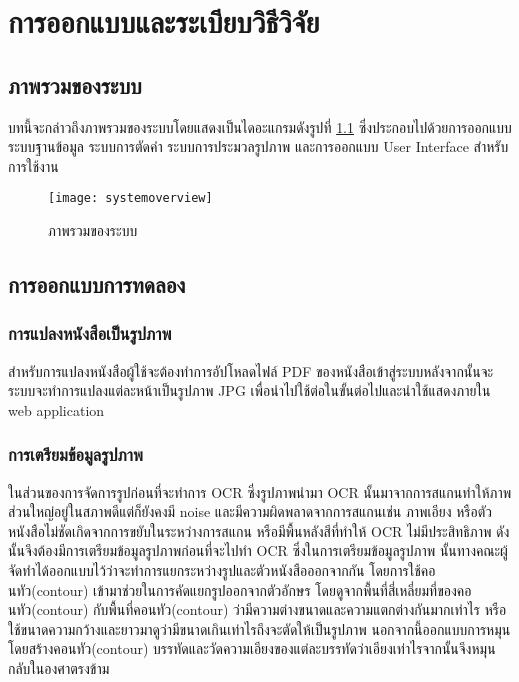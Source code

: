 \chapter{การออกแบบและระเบียบวิธีวิจัย}

\section{ภาพรวมของระบบ}

บทนี้จะกล่าวถึงภาพรวมของระบบโดยแสดงเป็นไดอะแกรมดังรูปที่ \ref{fig:systemoverview} ซึ่งประกอบไปด้วยการออกแบบระบบฐานข้อมูล ระบบการตัดคำ ระบบการประมวลรูปภาพ และการออกแบบ User Interface สำหรับการใช้งาน

\begin{figure}[H]
    \centering
    \texttt{[image: systemoverview]}
    \caption{ภาพรวมของระบบ}\label{fig:systemoverview}
\end{figure}

\section{การออกแบบการทดลอง}
\subsection{การแปลงหนังสือเป็นรูปภาพ}

สำหรับการแปลงหนังสือผู้ใช้จะต้องทำการอัปโหลดไฟล์ PDF ของหนังสือเข้าสู่ระบบหลังจากนั้นจะระบบจะทำการแปลงแต่ละหน้าเป็นรูปภาพ JPG เพื่อนำไปใช้ต่อในขั้นต่อไปและนำใช้แสดงภายใน web application

\subsection{การเตรียมข้อมูลรูปภาพ}

ในส่วนของการจัดการรูปก่อนที่จะทำการ OCR ซึ่งรูปภาพนำมา OCR นั้นมาจากการสแกนทำให้ภาพส่วนใหญ่อยู่ในสภาพดีแต่ก็ยังคงมี noise  และมีความผิดพลาดจากการสแกนเช่น ภาพเอียง หรือตัวหนังสือไม่ชัดเกิดจากการขยับในระหว่างการสแกน หรือมีพื้นหลังสีที่ทำให้ OCR ไม่มีประสิทธิภาพ ดังนั้นจึงต้องมีการเตรียมข้อมูลรูปภาพก่อนที่จะไปทำ OCR
ซึ่งในการเตรียมข้อมูลรูปภาพ นั้นทางคณะผู้จัดทำได้ออกแบบไว้ว่าจะทำการแยกระหว่างรูปและตัวหนังสือออกจากกัน โดยการใช้คอนทัว(contour) เข้ามาช่วยในการคัดแยกรูปออกจากตัวอักษร โดยดูจากพื้นที่สี่เหลี่ยมที่ของคอนทัว(contour) กับพื้นที่คอนทัว(contour) ว่ามีความต่างขนาดและความแตกต่างกันมากเท่าไร หรือใช้ขนาดความกว้างและยาวมาดูว่ามีขนาดเกินเท่าไรถึงจะตัดให้เป็นรูปภาพ
นอกจากนี้ออกแบบการหมุนโดยสร้างคอนทัว(contour) บรรทัดและวัดความเอียงของแต่ละบรรทัดว่าเอียงเท่าไรจากนั้นจึงหมุนกลับในองศาตรงข้าม


